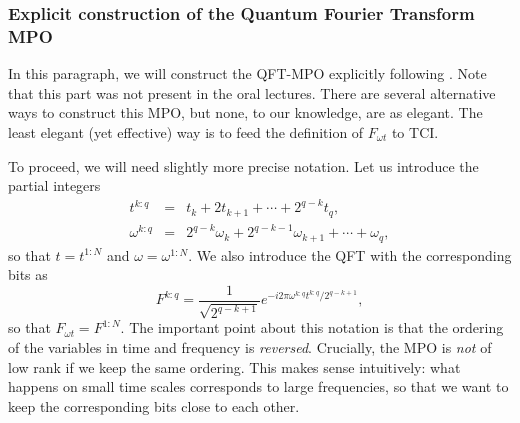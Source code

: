 \documentclass{SciPost}
\begin{document}
\subsubsection{Explicit construction of the Quantum Fourier Transform MPO}
In this paragraph, we will construct the QFT-MPO explicitly following \cite{chen2024}. Note that this part was not present in the oral lectures. There are several alternative ways to construct this MPO, but none, to our knowledge, are as elegant. The least elegant (yet effective) way is to feed the definition of $F_{\omega t}$ to TCI.

To proceed, we will need slightly more precise notation. Let us introduce the partial integers
\begin{eqnarray}
t^{k:q} &=& t_k + 2t_{k+1} +\cdots + 2^{q-k} t_{q}, \\
\omega^{k:q} &=& 2^{q-k} \omega_k + 2^{q-k-1}\omega_{k+1} +\cdots +  \omega_{q},
\end{eqnarray}
so that $t = t^{1:N}$ and $\omega = \omega^{1:N}$. We also introduce the QFT with the corresponding bits as
\begin{equation}
F^{k:q}= \frac{1}{\sqrt{2^{q-k+1}}} e^{-i2\pi \omega^{k:q} t^{k:q}/2^{q-k+1}},
\end{equation}
so that $F_{\omega t} = F^{1:N}$. The important point about this notation is that the ordering of the variables in time and frequency is \emph{reversed}. Crucially, the MPO is \emph{not} of low rank if we keep the same ordering. This makes sense intuitively: what happens on small time scales corresponds to large frequencies, so that we want to keep the corresponding bits close to each other.
\end{document}
